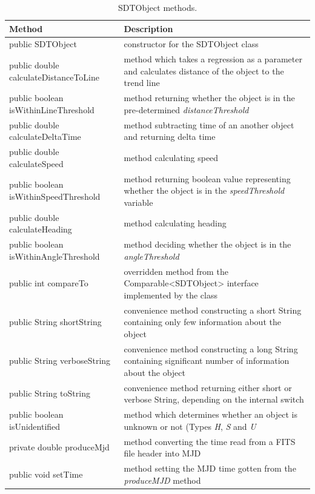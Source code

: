 \begin{table}[H]
\centering
\setlength{\extrarowheight}{2pt}
\begin{tabularx}{\textwidth}{|X|X|}
\hline
\textbf{Method} & \textbf{Description} \\ \hline
public \mbox{SDTObject} & constructor for the SDTObject class \\ \hline
public double \mbox{calculateDistanceToLine} & method which takes a regression as a parameter and calculates distance of the object to the trend line \\ \hline
public boolean \mbox{isWithinLineThreshold} & method returning whether the object is in the pre-determined \emph{distanceThreshold} \\ \hline
public double \mbox{calculateDeltaTime} & method subtracting time of an another object and returning delta time \\ \hline
public double \mbox{calculateSpeed} & method calculating speed \\ \hline
public boolean \mbox{isWithinSpeedThreshold} & method returning boolean value representing whether the object is in the \emph{speedThreshold} variable \\ \hline
public double \mbox{calculateHeading} & method calculating heading \\ \hline
public boolean \mbox{isWithinAngleThreshold} & method deciding whether the object is in the \emph{angleThreshold} \\ \hline
public int \mbox{compareTo} & overridden method from the Comparable<SDTObject> interface implemented by the class \\ \hline
public String \mbox{shortString} & convenience method constructing a short String containing only few information about the object \\ \hline
public String \mbox{verboseString} & convenience method constructing a long String containing significant number of information about the object \\ \hline
public String \mbox{toString} & convenience method returning either short or verbose String, depending on the internal switch \\ \hline
public boolean \mbox{isUnidentified} & method which determines whether an object is unknown or not (Types \emph{H}, \emph{S} and \emph{U} \\ \hline
private double \mbox{produceMjd} & method converting the time read from a FITS file header into MJD \\ \hline
public void \mbox{setTime} & method setting the MJD time gotten from the \emph{produceMJD} method \\ \hline
\end{tabularx}
\caption{SDTObject methods.}
\label{tab:class_methods_O}
\end{table}

